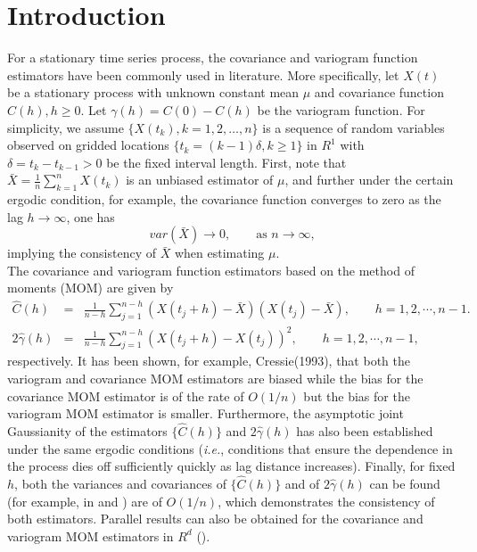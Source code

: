 %
%

\section{Introduction}

For a stationary time series process, the covariance and variogram function estimators have been commonly used in literature. More specifically, let $X(t)$ be a stationary process with unknown constant mean $\mu$ and covariance function $C(h), h \ge 0$. Let $\gamma(h) = C(0) - C(h)$ be the variogram function. For simplicity, we assume $\{X(t_k), k = 1, 2, \ldots, n\}$ is a sequence of random variables observed on gridded locations $\{t_k = (k-1)\delta, k \ge 1\}$ in $R^1$ with $\delta = t_k - t_{k-1} > 0$ be the fixed interval length. First, note that $\bar{X} = \frac{1}{n}\sum_{k=1}^n X(t_k)$ is an unbiased estimator of $\mu$, and further under the certain ergodic condition, for example, the covariance function converges to zero as the lag $h \to \infty$, one has
\[
var(\bar{X}) \to 0, \quad \quad \mbox{as $n \to \infty$,}
\]
implying the consistency of $\bar{X}$ when estimating $\mu$.  \\

The covariance and variogram function estimators based on the method of moments (MOM) are given by
\begin{eqnarray*}
\hat{C}(h) &=& \frac{1}{n-h}\sum_{j = 1}^{n-h}(X(t_j+h) - \bar{X})(X(t_j) - \bar{X}), \quad \quad h = 1, 2, \cdots, n-1.  \\
2\hat{\gamma}(h) &=& \frac{1}{n-h}\sum_{j = 1}^{n-h}(X(t_j+h) - X(t_j))^2, \quad \quad h = 1, 2, \cdots, n-1,
\end{eqnarray*}
respectively. It has been shown, for example, Cressie(1993), that both the variogram and covariance MOM estimators are biased while the bias for the covariance MOM estimator is of the rate of $O(1/n)$ but the bias for the variogram MOM estimator is smaller. Furthermore, the asymptotic joint Gaussianity of the estimators $\{\hat{C}(h)\}$ and $2\hat{\gamma}(h)$ has also been established under the same ergodic conditions ({\em i.e.}, conditions that ensure the dependence in the process dies off sufficiently quickly as lag distance increases). Finally, for fixed $h$, both the variances and covariances of $\{\hat{C}(h)\}$ and of $2\hat{\gamma}(h)$ can be found (for example, in \cite{fuller2009introduction} and \cite{cressie1985fitting}) are of $O(1/n)$, which demonstrates the consistency of both estimators. Parallel results can also be obtained for the covariance and variogram MOM estimators in $R^d$ (\cite{Cressie1993}). \\


